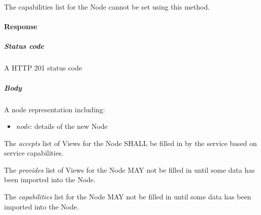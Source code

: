 \documentclass[11pt,a4paper]{ivoa}
\begin{document}
The capabilities list for the Node cannot be set using this method.

\paragraph{Response}
\subparagraph{Status code} A HTTP 201 status code
\subparagraph{Body}
A node representation including:
\begin{itemize}
    \item \emph{node}: details of the new Node
\end{itemize}

The \emph{accepts} list of Views for the Node SHALL be filled in by the service based on service capabilities.

The \emph{provides} list of Views for the Node MAY not be filled in until some data has been imported into the Node.

The \emph{capabilities} list for the Node MAY not be filled in until some data has been imported into the Node.
\end{document}
